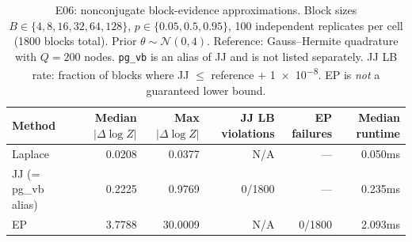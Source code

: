 \begin{table}[ht]
\centering
\caption{E06: nonconjugate block-evidence approximations. Block sizes $B\in\{4,8,16,32,64,128\}$,
$p\in\{0.05,0.5,0.95\}$, 100 independent replicates per cell (1800 blocks total).
Prior $\theta\sim\mathcal{N}(0,4)$. Reference: Gauss--Hermite quadrature with $Q=200$ nodes.
\texttt{pg\_vb} is an alias of JJ and is not listed separately.
JJ LB rate: fraction of blocks where JJ $\le$ reference $+$ \num{1e-8}.
EP is \emph{not} a guaranteed lower bound.}
\label{tab:planned-nonconjugate-paper}
\begin{tabular}{lrrrrr}
\toprule
Method & Median $|\Delta\log Z|$ & Max $|\Delta\log Z|$ & JJ LB violations & EP failures & Median runtime \\
\midrule
  Laplace & 0.0208 & 0.0377 & N/A & --- & 0.050ms \\
  JJ (= pg\_vb alias) & 0.2225 & 0.9769 & 0/1800 & --- & 0.235ms \\
  EP & 3.7788 & 30.0009 & N/A & 0/1800 & 2.093ms \\
\bottomrule
\end{tabular}
\end{table}
